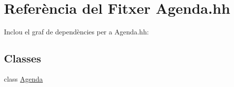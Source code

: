\hypertarget{_agenda_8hh}{}\section{Referència del Fitxer Agenda.\+hh}
\label{_agenda_8hh}
Inclou el graf de dependències per a Agenda.\+hh\+:
\subsection*{Classes}
\begin{DoxyCompactItemize}
\item 
class \hyperlink{class_agenda}{Agenda}
\end{DoxyCompactItemize}
